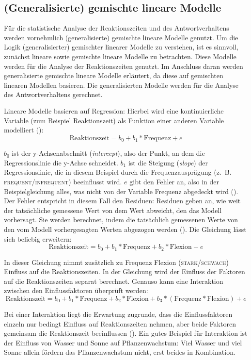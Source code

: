 \subsection{(Generalisierte) gemischte lineare Modelle} 

Für die statistische Analyse der Reaktionszeiten und des Antwortverhaltens werden vornehmlich (generalisierte) gemischte lineare Modelle genutzt. Um die Logik (generalisierter) gemischter linearer Modelle zu verstehen, ist es sinnvoll, zunächst lineare sowie  gemischte lineare Modelle zu betrachten. Diese Modelle werden für die Analyse der Reaktionszeiten genutzt. Im Anschluss daran werden generalisierte gemischte lineare Modelle erläutert, da diese auf gemischten linearen Modellen basieren. Die generalisierten Modelle werden für die Analyse des Antwortverhaltens gerechnet.

Lineare Modelle basieren auf Regression: Hierbei wird eine kontinuierliche Variable (zum Beispiel Reaktionszeit) als Funktion einer anderen Variable modelliert (\cite[69--72]{Winter.2020}):
\[ \text{Reaktionszeit} = b{_0} + b{_1} * \text{Frequenz} + e \]

$b{_0}$ ist der y-Achsenabschnitt (\textit{intercept}), also der Punkt, an dem die Regressionslinie die y-Achse schneidet. $b{_1}$ ist die Steigung (\textit{slope}) der Regressionslinie, die in diesem Beispiel durch die Frequenzausprägung (z.~B. \textsc{frequent}/\textsc{infrequent}) beeinflusst wird. $e$ gibt den Fehler an, also in der Beispielgleichung alles, was nicht von der Variable Frequenz abgedeckt wird (\cite[73--74]{Winter.2020}). Der Fehler entspricht in diesem Fall den Residuen: Residuen geben an, wie weit der tatsächliche gemessene Wert von dem Wert abweicht, den das Modell vorhersagt. Sie werden berechnet, indem die tatsächlich gemessenen Werte von den vom Modell vorhergesagten Werten abgezogen werden (\cite[73--74]{Winter.2020}). Die Gleichung lässt sich beliebig erweitern:
\[ \text{Reaktionszeit} = b{_0} + b{_1} * \text{Frequenz} + b{_2} * \text{Flexion} + e \]

In dieser Gleichung nimmt zusätzlich zu Frequenz Flexion (\textsc{stark}/\textsc{schwach}) Einfluss auf die Reaktionszeiten. In der Gleichung wird der Einfluss der Faktoren auf die Reaktionszeiten separat berechnet. Genauso kann eine Interaktion zwischen den Einflussfaktoren überprüft werden:
\[ \text{Reaktionszeit} = b{_0} + b{_1} * \text{Frequenz} + b{_2} * \text{Flexion} + b{_3} * (\text{Frequenz} * \text{Flexion}) + e \]

Bei einer Interaktion liegt die Erwartung zugrunde, dass die Einflussfaktoren einzeln nur bedingt Einfluss auf Reaktionszeiten nehmen, aber beide Faktoren gemeinsam die Reaktions\-zeit beeinflussen (\cite[133--134]{Winter.2020}). Ein gutes Beispiel für Interaktion ist der Einfluss von Wasser und Sonne auf Pflanzenwachstum: Viel Wasser und viel Sonne allein fördern das Pflanzenwachstum nicht, erst beides in Kombination.

